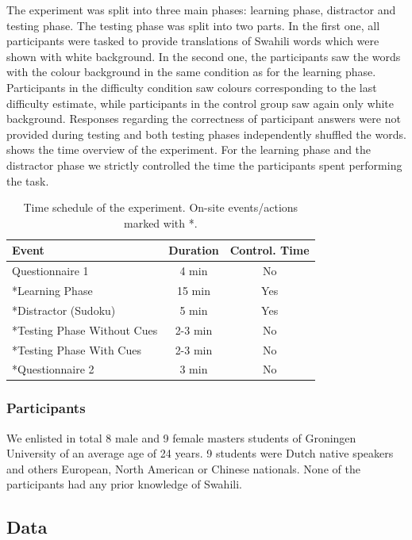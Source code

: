 The experiment was split into three main phases: learning phase, distractor and testing phase.
The testing phase was split into two parts.
In the first one, all participants were tasked to provide translations of Swahili words which were shown with white background.
In the second one, the participants saw the words with the colour background in the same condition as for the learning phase.
Participants in the difficulty condition saw colours corresponding to the last difficulty estimate, while participants in the control group saw again only white background.
Responses regarding the correctness of participant answers were not provided during testing and both testing phases independently shuffled the words.
 shows the time overview of the experiment.
For the learning phase and the distractor phase we strictly controlled the time the participants spent performing the task.

\begin{table}[ht]
\centering
\begin{tabular}{lcc}
\toprule
Event & Duration & Control. Time\\
\midrule
\hspace{0.15cm}Questionnaire 1 & 4 min & No \\
*Learning Phase & 15 min & Yes \\
*Distractor (Sudoku) & 5 min & Yes \\
*Testing Phase Without Cues & 2-3 min & No \\
*Testing Phase With Cues & 2-3 min & No \\
*Questionnaire 2 & 3 min & No \\
\bottomrule
\end{tabular}
\caption{Time schedule of the experiment. On-site events/actions marked with *.}
\label{tab:progression}
\end{table}

\subsubsection{Participants}

We enlisted in total 8 male and 9 female masters students of Groningen University of an average age of 24 years.
9 students were Dutch native speakers and others European, North American or Chinese nationals.
None of the participants had any prior knowledge of Swahili.

\subsection{Data}

